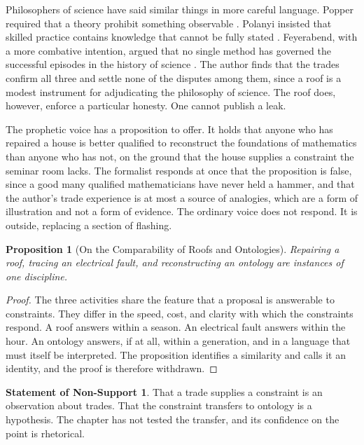 \documentclass[11pt,openany,twoside]{book}
\theoremstyle{plain}
\newtheorem{proposition}{Proposition}[chapter]
\theoremstyle{definition}
\newtheorem{nonsupport}{Statement of Non-Support}
\theoremstyle{remark}
\begin{document}
Philosophers of science have said similar things in more careful language. Popper required that a theory prohibit something observable \cite{popper-logic}. Polanyi insisted that skilled practice contains knowledge that cannot be fully stated \cite{polanyi-personal}. Feyerabend, with a more combative intention, argued that no single method has governed the successful episodes in the history of science \cite{feyerabend-method}. The author finds that the trades confirm all three and settle none of the disputes among them, since a roof is a modest instrument for adjudicating the philosophy of science. The roof does, however, enforce a particular honesty. One cannot publish a leak.

The prophetic voice has a proposition to offer. It holds that anyone who has repaired a house is better qualified to reconstruct the foundations of mathematics than anyone who has not, on the ground that the house supplies a constraint the seminar room lacks. The formalist responds at once that the proposition is false, since a good many qualified mathematicians have never held a hammer, and that the author's trade experience is at most a source of analogies, which are a form of illustration and not a form of evidence. The ordinary voice does not respond. It is outside, replacing a section of flashing.

\begin{proposition}[On the Comparability of Roofs and Ontologies]\label{prop:roof}
Repairing a roof, tracing an electrical fault, and reconstructing an ontology are instances of one discipline.
\end{proposition}

\begin{proof}
The three activities share the feature that a proposal is answerable to constraints. They differ in the speed, cost, and clarity with which the constraints respond. A roof answers within a season. An electrical fault answers within the hour. An ontology answers, if at all, within a generation, and in a language that must itself be interpreted. The proposition identifies a similarity and calls it an identity, and the proof is therefore withdrawn.
\end{proof}

\begin{nonsupport}
That a trade supplies a constraint is an observation about trades. That the constraint transfers to ontology is a hypothesis. The chapter has not tested the transfer, and its confidence on the point is rhetorical.
\end{nonsupport}
\end{document}
